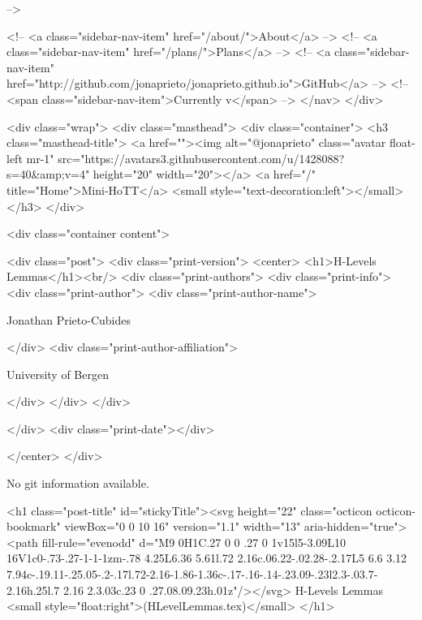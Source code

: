       
     -->

    <!-- <a class="sidebar-nav-item" href="/about/">About</a> -->
    <!-- <a class="sidebar-nav-item" href="/plans/">Plans</a> -->
    <!-- <a class="sidebar-nav-item" href="http://github.com/jonaprieto/jonaprieto.github.io">GitHub</a> -->
    <!-- <span class="sidebar-nav-item">Currently v</span> -->
  </nav>
</div>

    <div class="wrap">
      <div class="masthead">
        <div class="container">
          <h3 class="masthead-title">
            <a href=""><img alt="@jonaprieto" class="avatar float-left mr-1" src="https://avatars3.githubusercontent.com/u/1428088?s=40&amp;v=4" height="20" width="20"></a>
            <a href="/" title="Home">Mini-HoTT</a>
            <small style="text-decoration:left"></small>
          </h3>
        </div>
      
      <div class="container content">
        







<div class="post">
  <div class="print-version">
    <center>
      <h1>H-Levels Lemmas</h1><br/>
        <div class="print-authors">
          <div class="print-info">
            <div class="print-author">
              <div class="print-author-name">
                
                  Jonathan Prieto-Cubides
                
              </div>
              <div class="print-author-affiliation">
                
                  University of Bergen
                
                </div>
            </div>
          </div>
          
          
        </div>
        <div class="print-date"></div>
        
        
    </center>
  </div>

  
  No git information available.
  

  <h1 class="post-title" id="stickyTitle"><svg height="22" class="octicon octicon-bookmark" viewBox="0 0 10 16" version="1.1" width="13" aria-hidden="true"><path fill-rule="evenodd" d="M9 0H1C.27 0 0 .27 0 1v15l5-3.09L10 16V1c0-.73-.27-1-1-1zm-.78 4.25L6.36 5.61l.72 2.16c.06.22-.02.28-.2.17L5 6.6 3.12 7.94c-.19.11-.25.05-.2-.17l.72-2.16-1.86-1.36c-.17-.16-.14-.23.09-.23l2.3-.03.7-2.16h.25l.7 2.16 2.3.03c.23 0 .27.08.09.23h.01z"/></svg> H-Levels Lemmas <small style="float:right">(HLevelLemmas.tex)</small>
  </h1>


